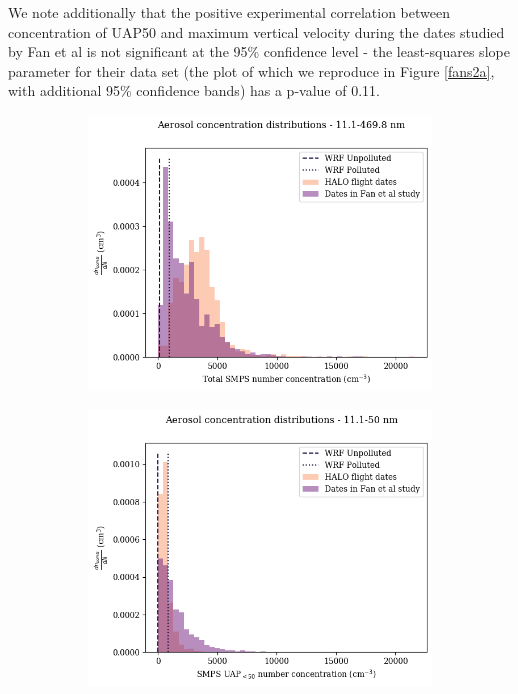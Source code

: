 \documentclass{article}
\begin{document}
We note additionally that the positive experimental correlation between concentration of UAP50 and maximum vertical velocity during the dates studied by Fan et al is not significant at the 95\% confidence level - the least-squares slope parameter for their data set (the plot of which we reproduce in Figure \ref{fans2a}, with additional 95\% confidence bands) has a p-value of 0.11.
\begin{figure}[ht]
	\centering
	\begin{subfigure}{0.7\textwidth}
		\includegraphics[width=\textwidth]{goama/v1_FINAL_tot_compare_nconc_hist_alldates_figure.png}
		\label{goamatothist}
		\caption{}
	\end{subfigure}
	\begin{subfigure}{0.7\textwidth}
		\includegraphics[width=\textwidth]{goama/v1_FINAL_uap50_compare_nconc_hist_alldates_figure.png}

\end{subfigure}
\end{figure}
\end{document}
